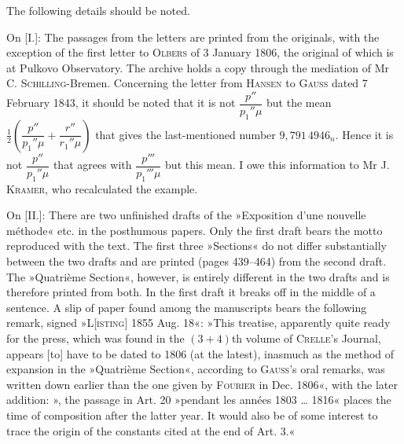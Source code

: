 \begingroup
{}
\renewcommand{\headrulewidth}{0pt}
\par\noindent\hspace*{\parindent}The following details should be noted.

\par\noindent\hspace*{\parindent}On [I.]: The passages from the letters are printed from the originals,
with the exception of the first letter to \textsc{Olbers} of 3 January 1806,
the original of which is at Pulkovo Observatory. The archive holds a copy
through the mediation of Mr C. \textsc{Schilling}-Bremen.
Concerning the letter from \textsc{Hansen} to \textsc{Gauss} dated 7 February 1843, it should be noted
that it is not \(\dfrac{p''}{p_1''\mu}\) but the mean
\(\frac12\left(\dfrac{p''}{p_1''\mu}+\dfrac{r''}{r_1''\mu}\right)\)
that gives the last-mentioned number \(9{,}791\,4946_n\). Hence it is not
\(\dfrac{p''}{p_1''\mu}\) that agrees with \(\dfrac{p'''}{p_1'''\mu}\)
but this mean. I owe this information to Mr J. \textsc{Kramer},
who recalculated the example.

\par\noindent\hspace*{\parindent}On [II.]: There are two unfinished drafts of the »Exposition d'une nouvelle méthode« etc.
in the posthumous papers. Only the first draft
bears the motto reproduced with the text. The first three »Sections« do not differ
substantially between the two drafts and are printed (pages 439--464) from the second
draft. The »Quatrième Section«, however, is entirely different in the two drafts
and is therefore printed from both. In the first draft it breaks off
in the middle of a sentence. A slip of paper found among the manuscripts bears
the following remark, signed »L[\textsc{isting}] 1855 Aug. 18«:
»This treatise, apparently quite ready for the press, which was found in the \((3+4)\)th volume
of \textsc{Crelle}'s Journal, appears [to] have to be dated to 1806 (at the latest),
inasmuch as the method of expansion in the »Quatrième Section«,
according to \textsc{Gauss}'s oral remarks, was written down earlier than the one
given by \textsc{Fourier} in Dec. 1806«, with the later addition:
», the passage in Art. 20 »pendant les années 1803 \ldots{} 1816«
places the time of composition after the latter year. It would also be of some interest
to trace the origin of the constants cited at the end of Art. 3.«

